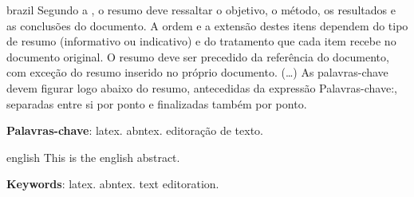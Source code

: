 \setlength{\absparsep}{18pt} %
\begin{resumo}[Resumo]
 \begin{otherlanguage*}{brazil}
    Segundo a , o resumo deve ressaltar o objetivo,
    o método, os resultados e as conclusões do documento. A ordem e a extensão destes
    itens dependem do tipo de resumo (informativo ou indicativo) e do tratamento que
    cada item recebe no documento original. O resumo deve ser precedido da referência
    do documento, com exceção do resumo inserido no próprio documento. (\ldots) As
    palavras-chave devem figurar logo abaixo do resumo, antecedidas da expressão
    Palavras-chave:, separadas entre si por ponto e finalizadas também por ponto.

    \textbf{Palavras-chave}: latex. abntex. editoração de texto.
 \end{otherlanguage*}
\end{resumo}
\begin{resumo}[Abstract]
 \begin{otherlanguage*}{english}
    This is the english abstract.
    
    \textbf{Keywords}: latex. abntex. text editoration.
 \end{otherlanguage*}
\end{resumo}
